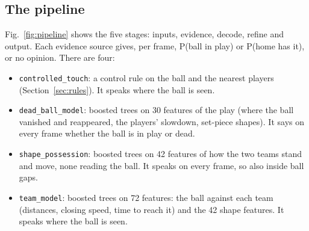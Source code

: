\documentclass[conference,a4paper]{IEEEtran}
\newcommand{\code}[1]{\texttt{#1}}
\begin{document}
\subsection{The pipeline}
Fig.~\ref{fig:pipeline} shows the five stages: inputs, evidence, decode, refine and output. Each evidence source
gives, per frame, P(ball in play) or P(home has it), or no opinion. There are four:
\begin{itemize}
\item \code{controlled\_touch}: a control rule on the ball and the nearest players (Section~\ref{sec:rules}). It
  speaks where the ball is seen.
\item \code{dead\_ball\_model}: boosted trees on 30 features of the play (where the ball vanished and reappeared,
  the players' slowdown, set-piece shapes). It says on every frame whether the ball is in play or dead.
\item \code{shape\_possession}: boosted trees on 42 features of how the two teams stand and move, none reading the
  ball. It speaks on every frame, so also inside ball gaps.
\item \code{team\_model}: boosted trees on 72 features: the ball against each team (distances, closing speed,
  time to reach it) and the 42 shape features. It speaks where the ball is seen.
\end{itemize}
\end{document}
